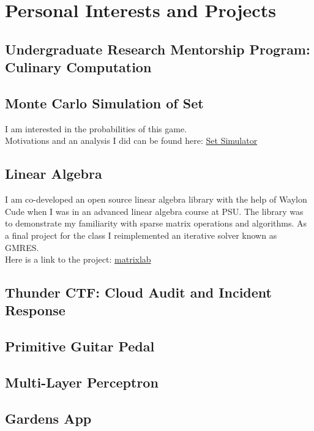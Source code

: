 \section{Personal Interests and Projects}

\subsection{Undergraduate Research Mentorship Program: Culinary Computation}

\subsection{Monte Carlo Simulation of Set\tiny\mdseries\textregistered}
I am interested in the probabilities of this game.\\
Motivations and an analysis I did can be found here:
\href{https://www.github.com/aujxn/set_game_simulator}{Set Simulator}

\subsection{Linear Algebra}
I am co-developed an open source linear algebra library with the help
of Waylon Cude when I was in an advanced linear algebra course at PSU.
The library was to demonstrate my familiarity with sparse matrix operations and algorithms.
As a final project for the class I reimplemented an iterative solver known as GMRES.\\
Here is a link to the project: \href{https://www.gitlab.com/AustenN/matrixlab}{matrixlab}

\subsection{Thunder CTF: Cloud Audit and Incident Response}

\subsection{Primitive Guitar Pedal}

\subsection{Multi-Layer Perceptron}

\subsection{Gardens App}


